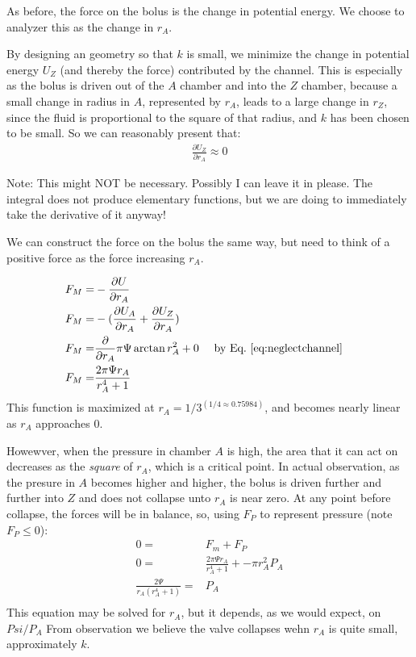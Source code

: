 \documentclass{asme2ej}
\begin{document}
As before, the force on the bolus is the change in potential
energy. We choose to analyzer this as the change in $r_A$.

By designing an geometry so that $k$ is small, we minimize
the change in potential energy $U_Z$ (and thereby the force) contributed by the
channel. This is especially as the bolus is driven out of the $A$ chamber
and into the $Z$ chamber, because a small change in radius in $A$,
represented by $r_A$, leads to a large change in $r_Z$, since the
fluid is proportional to the square of that radius, and $k$ has been
chosen to be small.  So we can reasonably present that:
\begin{align}
  \frac{\partial U_Z}{\partial r_A} \approx 0
  \label{eq:neglectchannel}
\end{align}

Note: This might NOT be necessary. Possibly I can leave it in please. The integral does
not produce elementary functions, but we are doing to immediately take the derivative of it anyway!


We can construct the force on the bolus the same way, but need to think of a positive
force as the force increasing $r_A$.

\begin{align}
  F_M = & - \frac{\partial U}{\partial r_A} \\
  F_M = &- (\frac{\partial U_A}{\partial r_A} +  \frac{\partial U_Z}{\partial r_A}) \\
  F_M = & \frac{\partial}{\partial r_A} \pi \Psi \arctan{r_A^2} + 0 && \text{ by Eq.~\ref{eq:neglectchannel}}  \\
  F_M = &  \frac{2 \pi \Psi r_A}{r_A^4 + 1} \\
  \label{eq:magforceradial}
\end{align}
This function is maximized at $ r_A = 1/3^(1/4 \approx 0.75984)$, and becomes nearly linear as $r_A$ approaches
$0$.

Howewver, when the pressure in chamber $A$ is high, the area that it can act on decreases as the {\em square}
of $r_A$, which is a critical point. In actual observation, as the presure in $A$ becomes higher
and higher, the bolus is driven further and further into $Z$ and does not collapse unto $r_A$ is near zero.
At any point before collapse, the forces will be in balance, so, using $F_P$ to represent pressure (note $F_P \leq 0$):
\begin{align}
  0 = & F_m + F_P \\
  0 = & \frac{2 \pi \Psi r_A}{r_A^4 + 1} + - \pi r_A^2 P_A \\
   \frac{2 \Psi }{r_A(r_A^4 + 1)} =&   P_A \\
\end{align}
This equation may be solved for $r_A$, but it depends, as we would expect, on $Psi /P_A$
From observation we believe the valve collapses wehn $r_A$ is quite small, approximately $k$.
\end{document}

